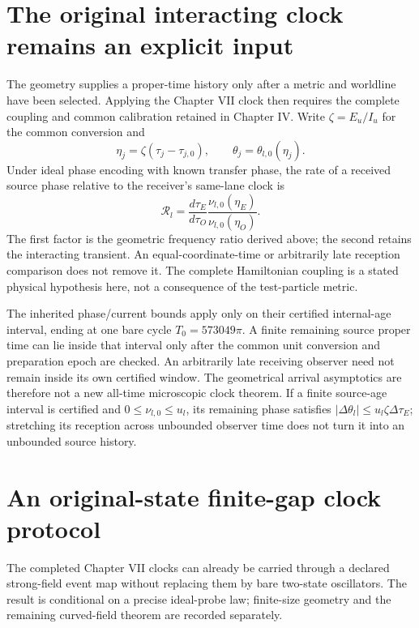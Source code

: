 \documentclass[10pt,twocolumn,letterpaper]{article}
\begin{document}
\section{The original interacting clock remains an explicit input}
The geometry supplies a proper-time history only after a metric and
worldline have been selected. Applying the Chapter VII clock then
requires the complete coupling and common calibration retained in
Chapter IV. Write $\zeta=E_u/I_u$ for the common conversion and
\begin{equation}
 \eta_j=\zeta(\tau_j-\tau_{j,0}),\qquad
 \theta_j=\theta_{l,0}(\eta_j).
\end{equation}
Under ideal phase encoding with known transfer phase, the rate of a
received source phase relative to the receiver's same-lane clock is
\begin{equation}
 \mathcal R_l=
 \frac{d\tau_E}{d\tau_O}
 \frac{\nu_{l,0}(\eta_E)}{\nu_{l,0}(\eta_O)}.
 \label{eq:strong-actual-clock}
\end{equation}
The first factor is the geometric frequency ratio derived above; the
second retains the interacting transient. An equal-coordinate-time or
arbitrarily late reception comparison does not remove it. The complete
Hamiltonian coupling is a stated physical hypothesis here, not a
consequence of the test-particle metric.

The inherited phase/current bounds apply only on their certified
internal-age interval, ending at one bare cycle
$T_0=573049\pi$. A finite remaining source proper time can lie inside
that interval only after the common unit conversion and preparation
epoch are checked. An arbitrarily late receiving observer need not
remain inside its own certified window. The geometrical arrival
asymptotics are therefore not a new all-time microscopic clock theorem.
If a finite source-age interval is certified and
$0\leq\nu_{l,0}\leq u_l$, its remaining phase satisfies
$|\Delta\theta_l|\leq u_l\zeta\Delta\tau_E$; stretching its reception
across unbounded observer time does not turn it into an unbounded
source history.

\section{An original-state finite-gap clock protocol}
\label{sec:original-clock-protocol}
The completed Chapter VII clocks can already be carried through a declared
strong-field event map without replacing them by bare two-state oscillators.
The result is conditional on a precise ideal-probe law; finite-size geometry
and the remaining curved-field theorem are recorded separately.
\end{document}
